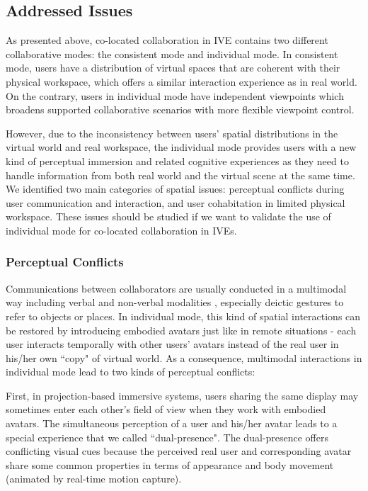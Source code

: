 \subsection{Addressed Issues}
As presented above, co-located collaboration in IVE contains two different collaborative modes: the consistent mode and individual mode. In consistent mode, users have a distribution of virtual spaces that are coherent with their physical workspace, which offers a similar interaction experience as in real world. On the contrary, users in individual mode have independent viewpoints which broadens supported collaborative scenarios with more flexible viewpoint control.

However, due to the inconsistency between users' spatial distributions in the virtual world and real workspace, the individual mode provides users with a new kind of perceptual immersion and related cognitive experiences as they need to handle information from both real world and the virtual scene at the same time. We identified two main categories of spatial issues: perceptual conflicts during user communication and interaction, and user cohabitation in limited physical workspace. These issues should be studied if we want to validate the use of individual mode for co-located collaboration in IVEs. 


\subsubsection{Perceptual Conflicts}
Communications between collaborators are usually conducted in a multimodal way \citep{Paggio2005Multimodal} including verbal and non-verbal modalities \citep{Ennis2010Seeing, Dodds2011Talk}, especially deictic gestures to refer to objects or places. In individual mode, this kind of spatial interactions can be restored by introducing embodied avatars just like in remote situations - each user interacts temporally with other users' avatars instead of the real user in his/her own ``copy" of virtual world.  As a consequence, multimodal interactions in individual mode lead to two kinds of perceptual conflicts:

First, in projection-based immersive systems, users sharing the same display may sometimes enter each other's field of view when they work with embodied avatars. The simultaneous perception of a user and his/her avatar leads to a special experience that we called ``dual-presence". The dual-presence offers conflicting visual cues because the perceived real user and corresponding avatar share some common properties in terms of appearance and body movement (animated by real-time motion capture).


